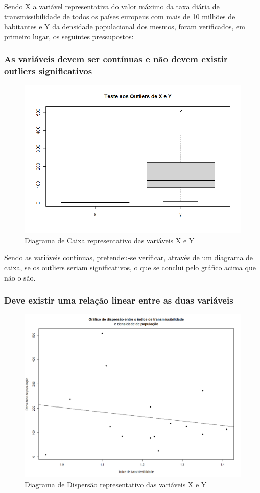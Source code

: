 \documentclass[conference]{IEEEtran}
\begin{document}
Sendo X a variável representativa do valor máximo da taxa diária de transmissibilidade de todos os países europeus com mais de 10 milhões de habitantes e Y da densidade populacional dos mesmos, foram verificados, em primeiro lugar, os seguintes pressupostos:

\subsubsection{As variáveis devem ser contínuas e não devem existir outliers significativos}

\begin{figure}[htbp]
\centerline{\includegraphics[width=0.95\columnwidth]{images/03.a.1.png}}
\caption{Diagrama de Caixa representativo das variáveis X e Y}
\label{fig}
\end{figure}

Sendo as variáveis contínuas, pretendeu-se verificar, através de um diagrama de caixa, se os outliers seriam significativos, o que se conclui pelo gráfico acima que não o são.

\subsubsection{Deve existir uma relação linear entre as duas variáveis}

\begin{figure}[htbp]
\centerline{\includegraphics[width=0.95\columnwidth]{images/03.a.2.png}}
\caption{Diagrama de Dispersão representativo das variáveis X e Y}
\label{fig}
\end{figure}
\end{document}
